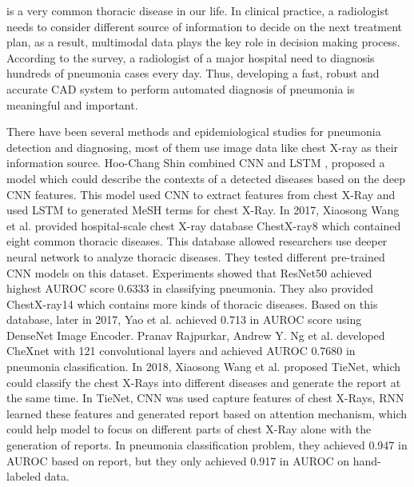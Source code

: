  is a very common thoracic disease in our life. In clinical practice, a radiologist needs to consider different source of information to decide on the next treatment plan, as a result, multimodal data plays the key role in decision making process. According to the survey, a radiologist of a major hospital need to diagnosis hundreds of pneumonia cases every day. Thus, developing a fast, robust and accurate CAD system to perform automated diagnosis of pneumonia is meaningful and important. 

There have been several methods and epidemiological studies \cite{Franquet2001Imaging}\cite{Thomas2005Standardized}\cite{deepika2018classification} for pneumonia detection and diagnosing, most of them use image data like chest X-ray as their information source.
Hoo-Chang Shin \cite{Shin2016Learning} combined CNN and LSTM \cite{hochreiter1997long}, proposed a model which could describe the contexts of a detected diseases based on the deep CNN features. This model used CNN to extract features from chest X-Ray and used LSTM to generated MeSH \cite{timmurphy.org} terms for chest X-Ray. In 2017, Xiaosong Wang et al. \cite{Wang2017ChestX} provided hospital-scale chest X-ray database ChestX-ray8 which contained eight common thoracic diseases. This database allowed researchers use deeper neural network to analyze thoracic diseases. They tested different pre-trained CNN models on this dataset. Experiments showed that ResNet50 achieved highest AUROC score 0.6333 in classifying pneumonia. They also provided ChestX-ray14 which contains more kinds of thoracic diseases.
Based on this database, later in 2017, Yao et al. \cite{yao2017learning} achieved 0.713 in AUROC score using DenseNet Image Encoder. Pranav Rajpurkar, Andrew Y. Ng et al. \cite{Rajpurkar2017CheXNet} developed CheXnet with 121 convolutional layers and achieved AUROC 0.7680 in pneumonia classification.
In 2018, Xiaosong Wang et al. \cite{Wang2018TieNet} proposed TieNet, which could classify the chest X-Rays into different diseases and generate the report at the same time. In TieNet, CNN was used capture features of chest X-Rays, RNN learned these features and generated report based on attention mechanism, which could help model to focus on different parts of chest X-Ray alone with the generation of reports. In pneumonia classification problem, they achieved 0.947 in AUROC based on report, but they only achieved 0.917 in AUROC on hand-labeled data. 

